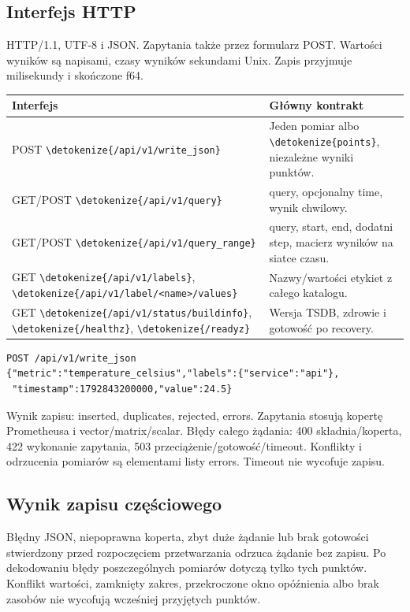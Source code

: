 \documentclass[11pt,a4paper]{article}
\newcommand{\code}[1]{\expandafter\nolinkurl\expandafter{\detokenize{#1}}}
\begin{document}
\subsection{Interfejs HTTP}
HTTP/1.1, UTF-8 i JSON. Zapytania także przez formularz POST.
Wartości wyników są napisami, czasy wyników sekundami Unix.
Zapis przyjmuje milisekundy i skończone f64.
\par
\begin{tabularx}{\linewidth}{P{68mm}Y}
  \toprule
  Interfejs                                                            & Główny kontrakt                         \\ \midrule
  POST \code{/api/v1/write_json}                                       & Jeden pomiar albo \code{points},
  niezależne wyniki punktów.                                                                                     \\
  GET/POST \code{/api/v1/query}                                        & query, opcjonalny time, wynik chwilowy. \\
  GET/POST \code{/api/v1/query_range}                                  & query, start, end, dodatni step,
  macierz wyników na siatce czasu.                                                                               \\
  GET \code{/api/v1/labels}, \code{/api/v1/label/<name>/values}        &
  Nazwy/wartości etykiet z całego katalogu.                                                                      \\
  GET \code{/api/v1/status/buildinfo}, \code{/healthz}, \code{/readyz} &
  Wersja TSDB, zdrowie i gotowość po recovery.                                                                   \\
  \bottomrule
\end{tabularx}
\begin{lstlisting}
POST /api/v1/write_json
{"metric":"temperature_celsius","labels":{"service":"api"},
 "timestamp":1792843200000,"value":24.5}
\end{lstlisting}
Wynik zapisu: inserted, duplicates, rejected, errors.
Zapytania stosują kopertę Prometheusa i vector/matrix/scalar.
Błędy całego żądania: 400 składnia/koperta,
422 wykonanie zapytania, 503 przeciążenie/gotowość/timeout.
Konflikty i odrzucenia pomiarów są elementami listy errors.
Timeout nie wycofuje zapisu.

\subsection{Wynik zapisu częściowego}
Błędny JSON, niepoprawna koperta, zbyt duże żądanie lub brak gotowości
stwierdzony przed rozpoczęciem przetwarzania odrzuca żądanie bez zapisu.
Po dekodowaniu błędy poszczególnych pomiarów dotyczą tylko tych punktów.
Konflikt wartości, zamknięty zakres, przekroczone okno opóźnienia albo
brak zasobów nie wycofują wcześniej przyjętych punktów.
\end{document}
